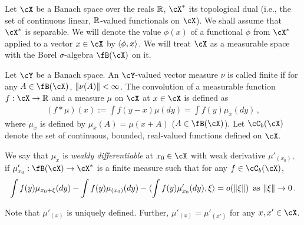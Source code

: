 \documentclass[11pt,letterpaper,english]{article}
\newcommand{\Borel}{\fB}
\newcommand{\Cb}{\cC_b}
\begin{document}
Let $\cX$ be a Banach space over the reals $\mathbb{R}$, 
$\cX^*$ its topological dual (i.e., the set of continuous linear, $\mathbb{R}$-valued functionals on $\cX$). 
We shall assume that $\cX^*$ is separable. 
We will denote the value $\phi(x)$ of a functional $\phi$ from $\cX^*$ applied to a vector $x\in \cX$ by $\langle \phi,x \rangle$.
We will treat $\cX$ as a measurable space with the Borel $\sigma$-algebra $\Borel(\cX)$ on it. 

Let $\cY$ be a Banach space.
An $\cY$-valued vector measure $\nu$ is called finite if for any $A\in \Borel(\cX)$, $\|\nu(A)\|<\infty$.
The convolution of a measurable function  $f: \cX \to \R$  and a measure $\mu$ on $\cX$ at $x\in \cX$ is defined as
\begin{align*}
\left( f*\mu \right) (x) := \int f(y-x)\mu (d y)
 = \int f(y)\mu_x(dy)\,,
\end{align*}
where $\mu_x$ is defined by $\mu_x(A) = \mu(x+A)$ ($A\in \Borel(\cX)$). 
Let $\Cb(\cX)$ denote the set of continuous, bounded, real-valued functions defined on $\cX$.
\begin{definition}
We say that $\mu_x$ is \emph{weakly differentiable} 
at $x_0\in \cX$ with weak derivative $\mu'_{(x_0)}$, if 
 $\mu'_{x_0}: \Borel(\cX)\to \cX^*$ is a finite measure such that for any $f \in \Cb(\cX)$,
\begin{align*}
\int f(y)\mu_{x_0+\xi}(dy) - \int f(y)\mu_{(x_0)}(dy)
-\langle \int f(y)\mu'_{x_0}(dy), \xi \rangle = o(\|\xi\|) \,\text{ as } \|\xi\|\to 0\,.
\end{align*}
\end{definition}
Note that $\mu'_{(x)}$ is uniquely defined.
Further, $\mu'_{(x)} = \mu'_{(x')}$ for any $x,x'\in \cX$.
\end{document}
